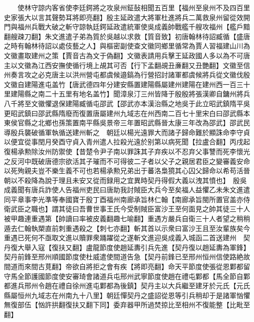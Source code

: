 　　使林守諒内客省使李廷鍔將之攻泉州鉦鼔相聞五百里【福州至泉州不及四百里史家張大以言其聲勢耳將即亮翻】殷主延政遣大將軍杜進將兵二萬救泉州留從效開門與福州兵戰大破之斬守諒執廷鍔延政遣統軍使吳成義帥戰艦千艘攻福州【艦戶黯翻艘疎刀翻】朱文進遣子弟為質於吳越以求救【質音致】初唐翰林待詔臧循【盛唐之時有翰林待詔以處伎藝之人】與樞密副使查文徽同鄉里循常為賈人習福建山川為文徽畫取建州之策【賈音古為文于偽翻】文徽表請用兵擊王延政國人多以為不可唐主以文徽為江西安撫使循行境上覘其可否【行下孟翻覘丑亷翻又丑艷翻】文徽至信州奏言攻之必克唐主以洪州營屯都虞候邉鎬為行營招討諸軍都虞候將兵從文徽伐殷文徽自建陽進屯盖竹【唐武德四年分建安縣置建陽縣屬建州建陽在建州西一百三十里建陽縣之南二十五里有地名盖竹】聞漳泉汀三州皆降于殷殷將張漢卿自鏞州將兵八千將至文徽懼退保建陽臧循屯邵武【邵武亦本漢治縣之地吳于此立昭武鎮隋平吳更昭武鎮曰邵武縣隋廢而復置唐屬建州九域志在州西南二百七十里宋白曰邵武縣本東侯官縣之北鄉也孫策置南平縣吳景帝三年置昭武縣晉太康三年改為邵武】邵武民導殷兵襲破循軍執循送建州斬之　朝廷以楊光遠罪大而諸子歸命難於顯誅命李守貞以便宜從事閏月癸酉守貞入青州遣人拉殺光遠於别第以病死聞【拉盧合翻】丙戌起復楊承勲除汝州防禦使【昔楚令尹子南以罪誅其子弃疾以不忍弃父事讐而死李懷光之反河中既破唐德宗欲活其子璀而不可得彼二子者以父子之親居君臣之變審義安命以死殉親夫豈不樂生義不可也若楊承勲兄弟出于蕃洛梟獍其心囚父歸命以希苟活晉朝以不殺降為說于理且未安又從而録用之宜異時契丹得假大義以洩其憤也】　殷吳成義聞有唐兵詐使人告福州吏民曰唐助我討賊臣大兵今至矣福人益懼乙未朱文進遣同平章事李光準等奉國寶于殷丁酉福州南廊承旨林仁翰【南廊承旨閩所置官盖亦侍衛武臣之職也】謂其徒曰吾曹世事王氏今受制賊臣富沙王至何面見之帥其徒三十人被甲趣連重遇第【帥讀曰率被皮義翻趣七喻翻】重遇方嚴兵自衛三十人者望之稍稍遁去仁翰執槊直前刺重遇殺之【刺七亦翻】斬其首以示衆曰富沙王且至汝輩族矣今重遇已死何不亟取文進以贖罪衆踊躍從之遂斬文進迎吳成義入城函二首送建州　契丹復大舉入寇【復扶又翻】盧龍節度使趙延夀引兵先進【契丹復以趙延夀為軍鋒】契丹前鋒至邢州順國節度使杜威遣使間道告急【契丹前鋒已至邢州恒州信使路絶故間道而來間古莧翻】帝欲自將拒之會有疾【將即亮翻】命天平節度使張從恩鄴都留守馬全節護國節度使安審琦會諸道兵屯邢州武寧節度使趙在禮屯鄴都【馬全節自鄴都進兵邢州令趙在禮自徐州進屯鄴都為後鎮】契丹主以大兵繼至建牙於元氏【元氏縣屬恒州九域志在州南九十八里】朝廷憚契丹之盛詔從恩等引兵稍却于是諸軍忷懼無復部伍【忷許拱翻復扶又翻下同】委弃器甲所過焚掠比至相州不復能整【比毗至翻】

